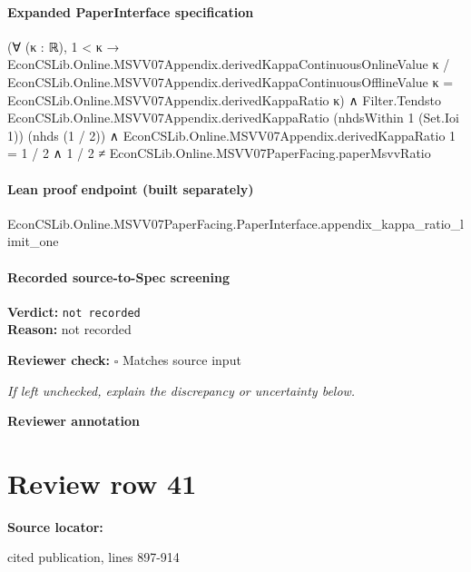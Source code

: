\documentclass[10pt]{article}
\newcommand{\reviewerbox}{%
  \par\noindent\fbox{\parbox{0.96\linewidth}{\rule{0pt}{0.38in}}}\par
}
\newcommand{\reviewmatch}[1]{%
  \par\noindent\textbf{Reviewer check:} $\square$\; #1\par
  \noindent\emph{If left unchecked, explain the discrepancy or uncertainty below.}\par
}
\begin{document}
\paragraph{Expanded PaperInterface specification}
\begin{ReviewVerbatim}
(∀ (κ : ℝ),
    1 < κ →
      EconCSLib.Online.MSVV07Appendix.derivedKappaContinuousOnlineValue κ /
          EconCSLib.Online.MSVV07Appendix.derivedKappaContinuousOfflineValue κ =
        EconCSLib.Online.MSVV07Appendix.derivedKappaRatio κ) ∧
  Filter.Tendsto EconCSLib.Online.MSVV07Appendix.derivedKappaRatio (nhdsWithin 1 (Set.Ioi 1)) (nhds (1 / 2)) ∧
    EconCSLib.Online.MSVV07Appendix.derivedKappaRatio 1 = 1 / 2 ∧
      1 / 2 ≠ EconCSLib.Online.MSVV07PaperFacing.paperMsvvRatio
\end{ReviewVerbatim}

\paragraph{Lean proof endpoint (built separately)}\begin{ReviewVerbatim}
EconCSLib.Online.MSVV07PaperFacing.PaperInterface.appendix_kappa_ratio_limit_one
\end{ReviewVerbatim}

\paragraph{Recorded source-to-Spec screening}
\textbf{Verdict:} \texttt{not recorded}
\\
\textbf{Reason:} not recorded
\reviewmatch{Matches source input}
\noindent\textbf{Reviewer annotation}\par
\reviewerbox
\clearpage
\hypertarget{source-claim-1a431a6683e44bcb}{}
\section*{Review row 41}
\textbf{Source locator:} {\footnotesize\raggedright cited publication, lines 897-\allowbreak{}914\par}
\end{document}
